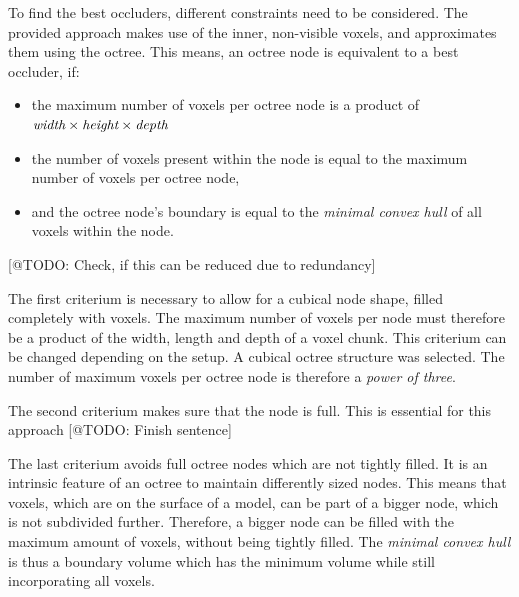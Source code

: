 \noindent
To find the best occluders, different constraints need to be considered. The provided approach makes use of the inner, 
non-visible voxels, and approximates them using the octree. This means, an octree node is equivalent to a best occluder, 
if:

\begin{itemize}
    \item the maximum number of voxels per octree node is a product of \begin{math}\emph{width} \times \emph{height} \times \emph{depth}\end{math}
    \item the number of voxels present within the node is equal to the maximum number of voxels per octree node,
    \item and the octree node's boundary is equal to the \emph{minimal convex hull} of all voxels within the node.
\end{itemize}

[@TODO: Check, if this can be reduced due to redundancy]

The first criterium is necessary to allow for a cubical node shape, filled completely with voxels. The maximum number 
of voxels per node must therefore be a product of the width, length and depth of a voxel chunk. This criterium can 
be changed depending on the setup. A cubical octree structure was selected. The number of maximum voxels per octree node 
is therefore a \emph{power of three}.

\noindent
The second criterium makes sure that the node is full. This is essential for this approach [@TODO: Finish sentence]

\noindent
The last criterium avoids full octree nodes which are not tightly filled. It is an intrinsic feature of an octree 
to maintain differently sized nodes. This means that voxels, which are on the surface of a model, can be part of 
a bigger node, which is not subdivided further. Therefore, a bigger node can be filled with the maximum amount of 
voxels, without being tightly filled. The \emph{minimal convex hull} is thus a boundary volume which has the minimum 
volume while still incorporating all voxels.


